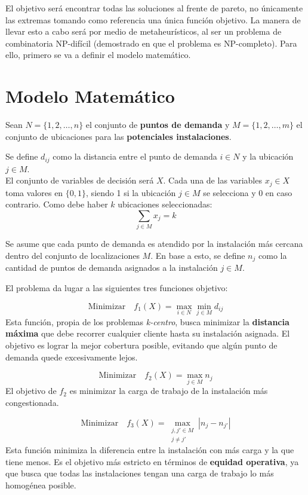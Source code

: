 \documentclass[12pt,a4paper]{book}
\begin{document}
El objetivo será encontrar todas las soluciones al frente de pareto, no únicamente las extremas tomando como referencia una única
función objetivo. La manera de llevar esto a cabo será por medio de metaheurísticos, al ser un problema de combinatoria NP-difícil (demostrado en \cite{k-balanced_1} que el problema es NP-completo). Para ello, 
primero se va a definir el modelo matemático.

\section{Modelo Matemático}
Sean $N=\{1, 2, \dots, n\}$ el conjunto de \textbf{puntos de demanda} y $M=\{1, 2, \dots, m\}$ el conjunto de ubicaciones para las \textbf{potenciales instalaciones}.

Se define $d_{ij}$ como la distancia entre el punto de demanda $i \in N$ y la ubicación $j \in M$.\\
El conjunto de variables de decisión será $X$. Cada una de las variables $x_j \in X$ toma valores en $\{0,1\}$, siendo 1 si la ubicación $j \in M$ se selecciona y 0 en caso contrario. Como debe haber $k$ ubicaciones seleccionadas:
\begin{equation}
    \sum_{j \in M} x_j = k
\end{equation}

Se asume que cada punto de demanda es atendido por la instalación más cercana dentro del conjunto de localizaciones $M$. En base a esto, se define $n_j$ como la cantidad de puntos de demanda asignados a la instalación $j \in M$.

El problema da lugar a las siguientes tres funciones objetivo:

\begin{equation}
    \text{Minimizar} \quad f_1(X) = \max_{i \in N} \min_{j \in M} d_{ij}
    \label{eq:f1}
\end{equation}
Esta función, propia de los problemas \textit{k-centro}, busca minimizar la \textbf{distancia máxima} que debe recorrer cualquier cliente hasta su instalación asignada. El objetivo es lograr la mejor cobertura posible, evitando que algún punto de demanda quede excesivamente lejos.

\begin{equation}
    \text{Minimizar} \quad f_2(X) = \max_{j \in M} n_j
    \label{eq:f2}
\end{equation}
El objetivo de $f_2$ es minimizar la carga de trabajo de la instalación más congestionada. 

\begin{equation}
    \text{Minimizar} \quad f_3(X) = \max_{\substack{j, j' \in M \\ j \neq j'}} |n_j - n_{j'}|
    \label{eq:f3}
\end{equation}
Esta función minimiza la diferencia entre la instalación con más carga y la que tiene menos. Es el objetivo más estricto en términos de \textbf{equidad operativa}, ya que busca que todas las instalaciones tengan una carga de trabajo lo más homogénea posible.
\end{document}
